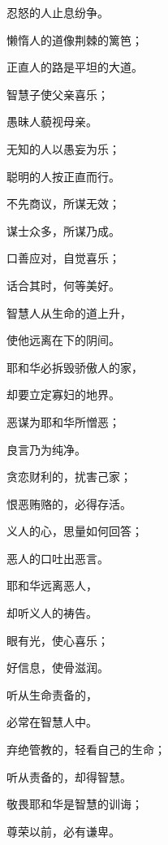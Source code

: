 {\par }{\Q 忍怒的人止息纷争。
\par }{\Q {}懒惰人的道像荆棘的篱笆；
\par }{\Q 正直人的路是平坦的大道。
\par }{\Q {}智慧子使父亲喜乐；
\par }{\Q 愚昧人藐视母亲。
\par }{\Q {}无知的人以愚妄为乐；
\par }{\Q 聪明的人按正直而行。
\par }{\Q {}不先商议，所谋无效；
\par }{\Q 谋士众多，所谋乃成。
\par }{\Q {}口善应对，自觉喜乐；
\par }{\Q 话合其时，何等美好。
\par }{\Q {}智慧人从生命的道上升，
\par }{\Q 使他远离在下的阴间。
\par }{\Q {}耶和华必拆毁骄傲人的家，
\par }{\Q 却要立定寡妇的地界。
\par }{\Q {}恶谋为耶和华所憎恶；
\par }{\Q 良言乃为纯净。
\par }{\Q {}贪恋财利的，扰害己家；
\par }{\Q 恨恶贿赂的，必得存活。
\par }{\Q {}义人的心，思量如何回答；
\par }{\Q 恶人的口吐出恶言。
\par }{\Q {}耶和华远离恶人，
\par }{\Q 却听义人的祷告。
\par }{\Q {}眼有光，使心喜乐；
\par }{\Q 好信息，使骨滋润。
\par }{\Q {}听从生命责备的，
\par }{\Q 必常在智慧人中。
\par }{\Q {}弃绝管教的，轻看自己的生命；
\par }{\Q 听从责备的，却得智慧。
\par }{\Q {}敬畏耶和华是智慧的训诲；
\par }{\Q 尊荣以前，必有谦卑。

}
